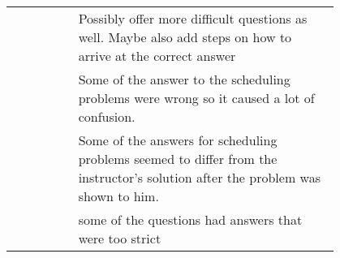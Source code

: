 {\begin{longtable}{R|p{0.8\linewidth}}
		& Possibly offer more difficult questions as well. Maybe also add steps on how to arrive at the correct answer                                                                                                                                                                                                                                                                                                                                                                                                                                                                                                                                                                                                                                     \\
		& Some of the answer to the scheduling problems were wrong so it caused a lot of confusion.                                                                                                                                                                                                                                                                                                                                                                                                                                                                                                                                                                                                                                                        \\
		& Some of the answers for scheduling problems seemed to differ from the instructor's solution after the problem was shown to him.                                                                                                                                                                                                                                                                                                                                                                                                                                                                                                                                                                                                                  \\
		& some of the questions had answers that were too strict                                                                                                                                                                                                                                                                                                                                                                                                                                                                                                                                                                                                                                                                                           \\

\end{longtable}}
